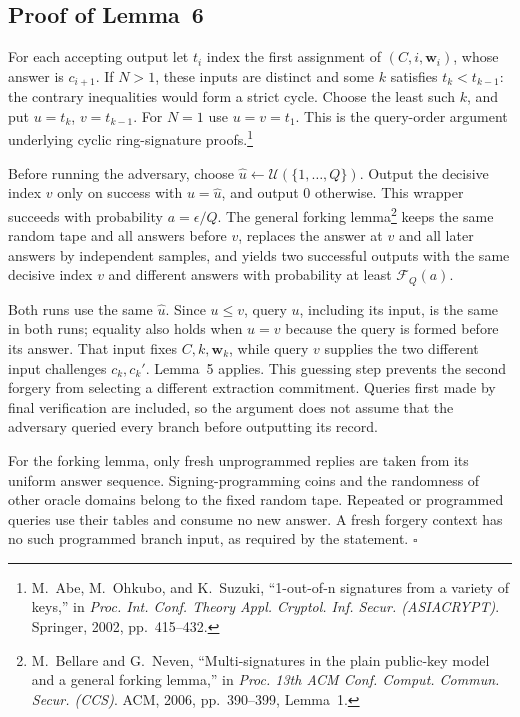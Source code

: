 \documentclass[lettersize,journal]{IEEEtran}
\newenvironment{proof}{{\noindent\it Proof:} }{\hfill $\square$\par}
\begin{document}
\subsection{Proof of Lemma~6}
\label{app:proof-cyclic-fork}
\begin{proof}
	For each accepting output let $t_i$ index the first assignment of $(C,i,\mathbf w_i)$, whose answer is $c_{i+1}$. If $N>1$, these inputs are distinct and some $k$ satisfies $t_k<t_{k-1}$: the contrary inequalities would form a strict cycle. Choose the least such $k$, and put $u=t_k$, $v=t_{k-1}$. For $N=1$ use $u=v=t_1$. This is the query-order argument underlying cyclic ring-signature proofs.\footnote{M.~Abe, M.~Ohkubo, and K.~Suzuki, ``1-out-of-n signatures from a variety of keys,'' in \emph{Proc. Int. Conf. Theory Appl. Cryptol. Inf. Secur. (ASIACRYPT)}. Springer, 2002, pp.~415--432.}
	
	Before running the adversary, choose $\widehat u\leftarrow\mathcal U(\{1,\ldots,Q\})$. Output the decisive index $v$ only on success with $u=\widehat u$, and output 0 otherwise. This wrapper succeeds with probability $a=\epsilon/Q$. The general forking lemma\footnote{M.~Bellare and G.~Neven, ``Multi-signatures in the plain public-key model and a general forking lemma,'' in \emph{Proc. 13th ACM Conf. Comput. Commun. Secur. (CCS)}. ACM, 2006, pp.~390--399, Lemma~1.} keeps the same random tape and all answers before $v$, replaces the answer at $v$ and all later answers by independent samples, and yields two successful outputs with the same decisive index $v$ and different answers with probability at least $\mathcal F_Q(a)$.
	
	Both runs use the same $\widehat u$. Since $u\le v$, query $u$, including its input, is the same in both runs; equality also holds when $u=v$ because the query is formed before its answer. That input fixes $C,k,\mathbf w_k$, while query $v$ supplies the two different input challenges $c_k,c_k'$. Lemma~5 applies. This guessing step prevents the second forgery from selecting a different extraction commitment. Queries first made by final verification are included, so the argument does not assume that the adversary queried every branch before outputting its record.
	
	For the forking lemma, only fresh unprogrammed replies are taken from its uniform answer sequence. Signing-programming coins and the randomness of other oracle domains belong to the fixed random tape. Repeated or programmed queries use their tables and consume no new answer. A fresh forgery context has no such programmed branch input, as required by the statement.
\end{proof}
\end{document}
